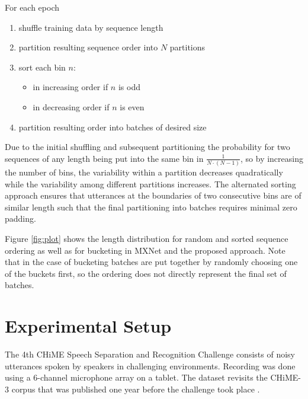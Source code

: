 \documentclass{article}
\begin{document}
 \begin{minipage}{\textwidth}
 	For each epoch
 	\begin{enumerate}
 		\item shuffle training data by sequence length
 		\item partition resulting sequence order into $N$ partitions
 		\item sort each bin $n$:
 		\begin{itemize}
 			\item in increasing order if $n$ is odd
 			\item in decreasing order if $n$ is even
 		\end{itemize}
 		\item partition resulting order into batches of desired size \\[1ex]
 	\end{enumerate}
 \end{minipage}

 Due to the initial shuffling and subsequent partitioning the probability for two sequences of any length being 
 put into the same bin in $\frac{1}{N\cdot(N-1)}$, so by increasing the number of bins, the variability within a 
 partition decreases quadratically while the variability among different partitions increases. The alternated
 sorting approach ensures that utterances at the boundaries of two consecutive bins are of similar length such 
 that the final partitioning into batches requires minimal zero padding.
 
 Figure \ref{fig:plot} shows the length distribution for random and sorted sequence ordering as well as for bucketing in MXNet and the proposed approach. Note that in the case of bucketing batches are put
 together by randomly choosing one of the buckets first, so the ordering does not directly represent 
 the final set of batches.

  \section{Experimental Setup} \label{sec:setup}
  The 4th CHiME Speech Separation and Recognition Challenge
  \cite{Vincent_CSL2016:CHiME4} consists of noisy utterances spoken by speakers in challenging 
  environments. Recording was done using a 6-channel microphone array on a tablet. The dataset revisits 
  the CHiME-3 corpus that was published one year before the challenge took place \cite{Barker2015:CHiME3}.
  
\end{document}
